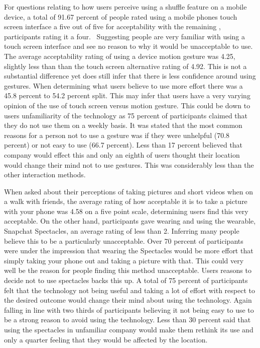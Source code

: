 \documentclass{l4proj}
\begin{document}
For questions relating to how users perceive using a shuffle feature on a mobile device, a total of 91.67 percent of people rated using a mobile phones touch screen interface a five out of five for acceptability with the remaining , participants rating it a four.  Suggesting people are very familiar with using a touch screen interface and see no reason to why it would be unacceptable to use. The average acceptability rating of using a device motion gesture was 4.25, slightly less than than the touch screen alternative rating of 4.92. This is not a substantial difference yet does still infer that there is less confidence around using gestures. When determining what users believe to use more effort there was a 45.8 percent to 54.2 percent split. This may infer that users have a very varying opinion of the use of touch screen versus motion gesture. This could be down to users unfamiliarity of the technology as 75 percent of participants claimed that they do not use them on a weekly basis. It was stated that the most common reasons for a person not to use a gesture was if they were unhelpful (70.8 percent) or not easy to use (66.7 percent). Less than 17 percent believed that company would effect this and only an eighth of users thought their location would change their mind not to use gestures. This was considerably less than the other interaction methods.

When asked about their perceptions of taking pictures and short videos when on a walk with friends, the average rating of how acceptable it is to take a picture with your phone was 4.58 on a five point scale, determining users find this very acceptable. On the other hand, participants gave wearing and using the wearable, Snapchat Spectacles, an average rating of less than 2. Inferring many people believe this to be a particularly unacceptable. Over 70 percent of participants were under the impression that wearing the Spectacles would be more effort that simply taking your phone out and taking a picture with that. This could very well be the reason for people finding this method unacceptable. Users reasons to decide not to use spectacles backs this up. A total of 75 percent of participants felt that the technology not being useful and taking a lot of effort with respect to the desired outcome would change their mind about using the technology. Again falling in line with two thirds of participants believing it not being easy to use to be a strong reason to avoid using the technology. Less than 30 percent said that using the spectacles in unfamiliar company would make them rethink its use and only a quarter feeling that they would be affected by the location. 
\end{document}
